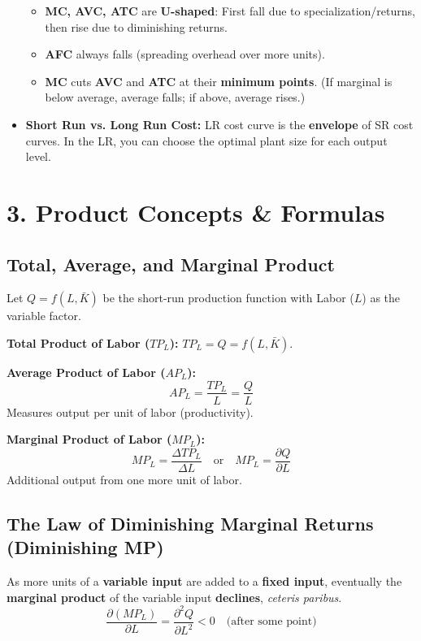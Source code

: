 \documentclass[10pt,a4paper]{article}
\begin{document}
\begin{multicols}{2}
\begin{itemize}[leftmargin=*,nosep]
\begin{itemize}[nosep]
        \item \textbf{MC, AVC, ATC} are \textbf{U-shaped}: First fall due to specialization/returns, then rise due to diminishing returns.
        \item \textbf{AFC} always falls (spreading overhead over more units).
        \item \textbf{MC} cuts \textbf{AVC} and \textbf{ATC} at their \textbf{minimum points}. (If marginal is below average, average falls; if above, average rises.)
    \end{itemize}
    \item \textbf{Short Run vs. Long Run Cost:} LR cost curve is the \textbf{envelope} of SR cost curves. In the LR, you can choose the optimal plant size for each output level.
\end{itemize}

\section*{3. Product Concepts \& Formulas}

\subsection*{Total, Average, and Marginal Product}
Let $Q = f(L, \bar{K})$ be the short-run production function with Labor ($L$) as the variable factor.

\textbf{Total Product of Labor ($TP_L$):} $TP_L = Q = f(L, \bar{K})$.

\textbf{Average Product of Labor ($AP_L$):}
\[
AP_L = \frac{TP_L}{L} = \frac{Q}{L}
\]
Measures output per unit of labor (productivity).

\textbf{Marginal Product of Labor ($MP_L$):}
\[
MP_L = \frac{\Delta TP_L}{\Delta L} \quad \text{or} \quad MP_L = \frac{\partial Q}{\partial L}
\]
Additional output from one more unit of labor.

\subsection*{The Law of Diminishing Marginal Returns (Diminishing MP)}
As more units of a \textbf{variable input} are added to a \textbf{fixed input}, eventually the \textbf{marginal product} of the variable input \textbf{declines}, \textit{ceteris paribus}.
\[
\frac{\partial (MP_L)}{\partial L} = \frac{\partial^2 Q}{\partial L^2} < 0 \quad \text{(after some point)}
\]


\end{multicols}
\end{document}
